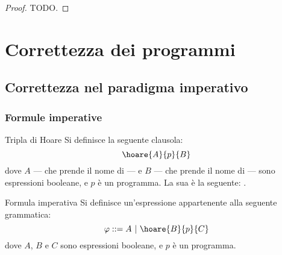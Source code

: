 \documentclass[a4paper, 12pt]{report}
\begin{document}
    \begin{proof}
        TODO.
    \end{proof}

    \chapter{Correttezza dei programmi}
    
    \section{Correttezza nel paradigma imperativo}

    \subsection{Formule imperative}

    \begin{frameddefn}{Tripla di Hoare}
        Si definisce  la seguente clausola: $$\hoare{A}{p}{B}$$ dove $A$ --- che prende il nome di  --- e $B$ --- che prende il nome di  --- sono espressioni booleane, e $p$ è un programma. La sua  è la seguente: .
    \end{frameddefn}

    \begin{frameddefn}[label={imp formula}]{Formula imperativa}
        Si definisce  un'espressione appartenente alla seguente grammatica: $$\varphi ::= A \ | \ \hoare{B}{p}{C}$$ dove $A$, $B$ e $C$ sono espressioni booleane, e $p$ è un programma.
    \end{frameddefn}
\end{document}
